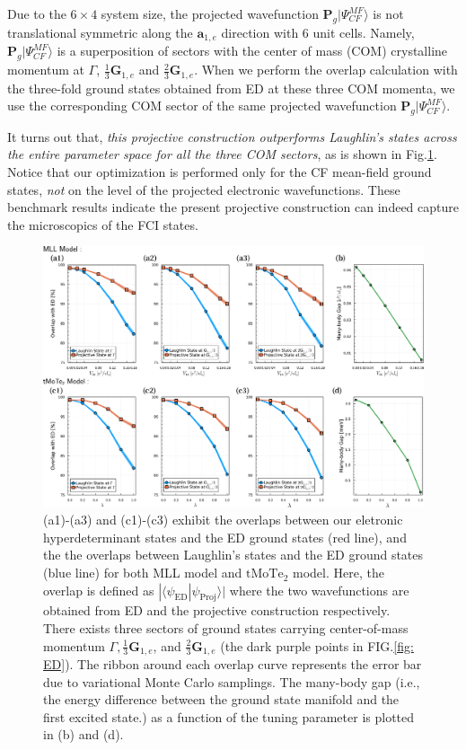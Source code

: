 Due to the $6\times4$ system size, the projected wavefunction $\mathbf P_g|\Psi^{MF}_{CF}\rangle$ is not translational symmetric along the $\mathbf a_{1,e}$ direction with $6$ unit cells. Namely, $\mathbf P_g|\Psi^{MF}_{CF}\rangle$ is a superposition of sectors with the center of mass (COM) crystalline momentum at $\Gamma$, $\frac{1}{3}\mathbf G_{1,e}$ and $\frac{2}{3}\mathbf G_{1,e}$. When we perform the overlap calculation with the three-fold ground states obtained from ED at these three COM momenta, we use the corresponding COM sector of the same projected wavefunction $\mathbf P_g|\Psi^{MF}_{CF}\rangle$. 

It turns out that, \emph{this projective construction outperforms Laughlin's states across the entire parameter space for all the three COM sectors}, as is shown in Fig.\ref{fig: ED overlap}. Notice that our optimization is performed only for the CF mean-field ground states, \emph{not} on the level of the projected electronic wavefunctions. These benchmark results indicate the present projective construction can indeed capture the microscopics of the FCI states.

\begin{figure}
    \centering
    \includegraphics[width=\textwidth]{contents/FCI_ProjWfc/figures/combined_overlap.pdf}
    \caption{(a1)-(a3) and (c1)-(c3) exhibit the overlaps between our eletronic hyperdeterminant states and the ED ground states (red line), and the the overlaps between Laughlin's states and the ED ground states (blue line) for both MLL model and $\mathrm{tMoTe_2}$ model. Here, the overlap is defined as $|\langle \psi_{\text{ED}}|\psi_{\text{Proj}}\rangle|$ where the two wavefunctions are obtained from ED and the projective construction respectively. There exists three sectors of ground states carrying center-of-mass momentum $\Gamma, \frac{1}{3}\mathbf G_{1,e}$, and $\frac{2}{3}\mathbf G_{1,e}$ (the dark purple points in FIG.\ref{fig: ED}). The ribbon around each overlap curve represents the error bar due to variational Monte Carlo samplings. The many-body gap (i.e., the energy difference between the ground state manifold and the first excited state.) as a function of the tuning parameter is plotted in (b) and (d).}
    \label{fig: ED overlap}
\end{figure}

